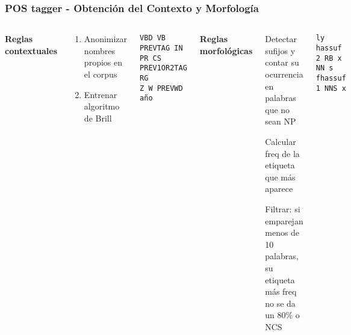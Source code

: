 \documentclass{beamer}
\begin{document}
\begin{frame}[fragile]
\frametitle{POS tagger - Obtención del Contexto y Morfología}
\begin{columns}[t] %
\textbf{Reglas contextuales}
\begin{scriptsize}
\begin{enumerate}
\item Anonimizar nombres propios en el corpus
\item Entrenar algoritmo de Brill
\end{enumerate}
\end{scriptsize}
\begin{example}
\begin{scriptsize}
\begin{verbatim}
VBD VB PREVTAG IN
PR CS PREV1OR2TAG RG
Z W PREVWD año
\end{verbatim}
\end{scriptsize}
\end{example}
\textbf{Reglas morfológicas}
\begin{enumerate}
\begin{scriptsize}
\item Detectar sufijos y contar su ocurrencia en palabras que no sean NP
\item Calcular freq de la etiqueta que más aparece
\item Filtrar: si emparejan menos de 10 palabras, su etiqueta más freq no se da un 80\% o NCS
\end{scriptsize}
\end{enumerate}
\begin{example}
\begin{scriptsize}
\begin{verbatim}
ly hassuf 2 RB x
NN s fhassuf 1 NNS x
\end{verbatim}\end{scriptsize}
\end{example}

\end{columns}
\end{frame}
\end{document}
